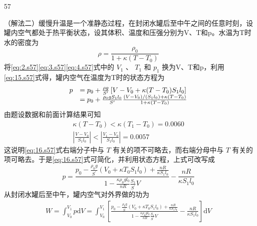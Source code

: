 \begin{solution}{57}
\begin{subsolution}
        （解法二）缓慢升温是一个准静态过程，在封闭水罐后至中午之间的任意时刻，设罐内空气都处于热平衡状态，设其体积、温度和压强分别为V、T和p。水温为T时水的密度为
        \begin{equation}
            \rho = \frac {\rho_{0}}{1 + \kappa (T - T _ {0})}
            \label{eq:15.s57}
        \end{equation}
        将\eqref{eq:2.s57}\eqref{eq:3.s57}\eqref{eq:4.s57}式中的 $V_{1}$ 、 $T_{1}$ 和 $p_{1}$ 换为V、T和p，利用\eqref{eq:15.s57}式得，罐内空气在温度为T时的状态方程为
        \begin{equation}
            \begin{array}{r l}
                p & = p _ {0} + \frac {\rho g}{S^{\prime}} \left[ V - V _ {0} + \kappa (T - T _ {0}) S _ {1} l _ {0} \right] \\
                & = p _ {0} + \frac {\rho_{0} g S _ {1} l _ {0}}{S^{\prime}} \frac {(V - V _ {0}) / (S _ {1} l _ {0}) + \kappa (T - T _ {0})}{1 + \kappa (T - T _ {0})}
            \end{array}
            \label{eq:16.s57}
        \end{equation}
        由题设数据和前面计算结果可知
        \begin{equation}
            \begin{array}{l}
                \kappa (T - T _ {0}) < \kappa (T _ {1} - T _ {0}) = 0.0060 \\
                \left| \frac {V - V _ {0}}{S _ {1} l _ {0}} \right| < \left| \frac {V _ {1} - V _ {0}}{S _ {1} l _ {0}} \right| = 0.0057
            \end{array}
            \label{eq:17.s57}
        \end{equation}
        这说明\eqref{eq:16.s57}式右端分子中与 $T$ 有关的项不可略去，而右端分母中与 $T$ 有关的项可略去。于是\eqref{eq:16.s57}式可简化，并利用状态方程，上式可改写成
        \begin{equation}
            p = \frac {p _ {0} - \frac {\rho_{0} g}{S^{\prime}} \left(V _ {0} + \kappa T _ {0} S _ {1} l _ {0}\right) + \frac {n R}{\kappa S _ {1} l _ {0}}}{1 - \frac {\kappa \rho_{0} g l _ {0}}{n R} \frac {S _ {1}}{S^{\prime}} V} - \frac {n R}{\kappa S _ {1} l _ {0}}
            \label{eq:18.s57}
        \end{equation}
        从封闭水罐后至中午，罐内空气对外界做的功为
        \begin{equation}
            \begin{array}{l}
                W = \int_{V _ {0}}^{V _ {1}} p \mathrm{d} V = \int_{V _ {0}}^{V _ {1}} \left[ \frac {p _ {0} - \frac {\rho_{0} g}{S^{\prime}} (V _ {0} + \kappa T _ {0} S _ {1} l _ {0}) + \frac {n R}{\kappa S _ {1} l _ {0}}}{1 - \frac {\kappa \rho_{0} g l _ {0}}{n R} \frac {S _ {1}}{S^{\prime}} V} - \frac {n R}{\kappa S _ {1} l _ {0}} \right] \mathrm{d} V \\

\end{array}
\end{equation}
\end{subsolution}
\end{solution}
